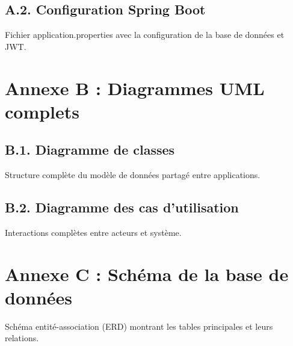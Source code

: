 \documentclass[12pt,a4paper]{report}
\numberwithin{figure}{chapter}
\numberwithin{table}{chapter}
\begin{document}
\subsection*{A.2. Configuration Spring Boot}
Fichier application.properties avec la configuration de la base de données et JWT.

\section*{Annexe B : Diagrammes UML complets}

\subsection*{B.1. Diagramme de classes}
Structure complète du modèle de données partagé entre applications.

\subsection*{B.2. Diagramme des cas d'utilisation}
Interactions complètes entre acteurs et système.

\section*{Annexe C : Schéma de la base de données}

Schéma entité-association (ERD) montrant les tables principales et leurs relations.
\end{document}
